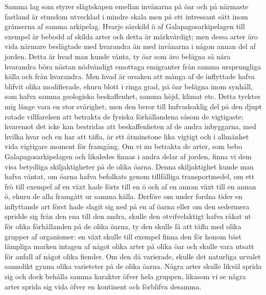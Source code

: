Samma lag som styrer slägtskapen emellan invånarna på öar och på närmaste fastland är stundom utvecklad i mindre skala men på ett intressant sätt inom gränserna af samma arkipelag. Hvarje särskild ö af Galapagosarkipelagen till exempel är bebodd af skilda arter och detta är märkvärdigt; men dessa arter äro vida närmare beslägtade med hvarandra än med invånarna i någon annan del af jorden. Detta är hvad man kunde vänta, ty öar som äro belägna så nära hvarandra böra nästan nödvändigt emottaga emigranter från samma ursprungliga källa och från hvarandra. Men hvad är orsaken att många af de inflyttade hafva blifvit olika modifierade, ehuru blott i ringa grad, på öar belägna inom synhåll, som hafva samma geologiska beskaffenhet, samma höjd, klimat etc. Detta tycktes mig länge vara en stor svårighet, men den beror till hufvudsaklig del på den djupt rotade villfarelsen att betrakta de fysiska förhållandena såsom de vigtigaste; hvaremot det icke kan bestridas att beskaffenheten af de andra inbyggarna, med hvilka hvar och en har att täfla, är ett åtminstone lika vigtigt och i allmänhet vida vigtigare moment för framgång. Om vi nu betrakta de arter, som bebo Galapagosarkipelagen och likaledes finnas i andra delar af jorden, finna vi dem visa betydliga skiljaktigheter på de olika öarna. Denna skiljaktighet kunde man hafva väntat, om öarna hafva befolkats genom tillfälliga transportmedel, om ett frö till exempel af en växt hade förts till en ö och af en annan växt till en annan ö, ehuru de alla framgått ur samma källa. Derföre om under fordna tider en inflyttande art först hade slagit sig ned på en af öarna eller om den sedermera spridde sig från den ena till den andra, skulle den otvifvelaktigt hafva råkat ut för olika förhållanden på de olika öarna, ty den skulle få att täfla med olika grupper af organismer: en växt skulle till exempel finna den för honom bäst lämpliga marken intagen af något olika arter på olika öar och skulle vara utsatt för anfall af något olika fiender. Om den då varierade, skulle det naturliga urvalet sannolikt gynna olika varieteter på de olika öarna. Några arter skulle likväl sprida sig och dock behålla samma karakter öfver hela gruppen, likasom vi se några arter sprida sig vida öfver en kontinent och förblifva desamma.

